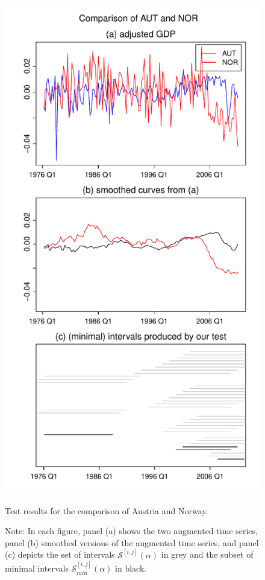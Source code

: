 \documentclass[a4paper,12pt]{article}
\begin{document}
{\begin{figure}[p!]
\begin{minipage}[t]{0.49\textwidth}
\includegraphics[width=\textwidth]{plots/AUT_vs_NOR}
\caption{Test results for the comparison of Austria and Norway.}\label{fig:Austria:Norway}
\end{minipage}

\caption*{Note: In each figure, panel (a) shows the two augmented time series, panel (b) smoothed versions of the augmented time series, and panel (c) depicts the set of intervals $\mathcal{S}^{[i,j]}(\alpha)$ in grey and the subset of minimal intervals $\mathcal{S}^{[i,j]}_{min}(\alpha)$ in black.}
\end{figure}

}
\end{document}
